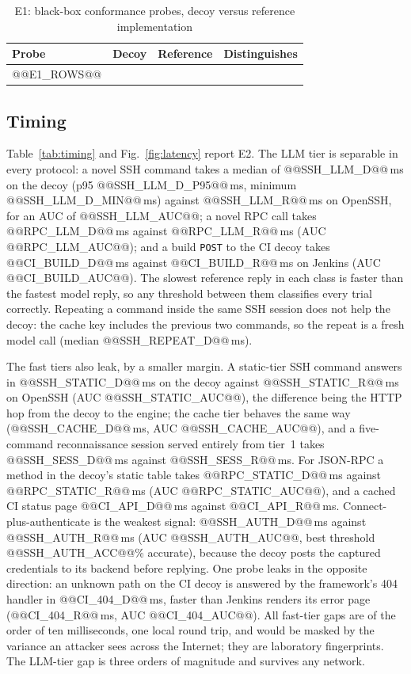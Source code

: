 \documentclass[conference]{IEEEtran}
\begin{document}
\begin{table}[!t]
\caption{E1: black-box conformance probes, decoy versus reference implementation}
\label{tab:conf}
\centering
\footnotesize
\renewcommand{\arraystretch}{1.12}
\begin{tabular}{@{}p{}p{}p{}c@{}}
\toprule
Probe & Decoy & Reference & Distinguishes \\
\midrule
@@E1_ROWS@@
\bottomrule
\end{tabular}
\end{table}

\subsection{Timing}
\label{sec:res-time}
Table~\ref{tab:timing} and Fig.~\ref{fig:latency} report E2. The LLM tier is separable in every protocol: a novel SSH command takes a median of @@SSH_LLM_D@@\,ms on the decoy (p95 @@SSH_LLM_D_P95@@\,ms, minimum @@SSH_LLM_D_MIN@@\,ms) against @@SSH_LLM_R@@\,ms on OpenSSH, for an AUC of @@SSH_LLM_AUC@@; a novel RPC call takes @@RPC_LLM_D@@\,ms against @@RPC_LLM_R@@\,ms (AUC @@RPC_LLM_AUC@@); and a build \texttt{POST} to the CI decoy takes @@CI_BUILD_D@@\,ms against @@CI_BUILD_R@@\,ms on Jenkins (AUC @@CI_BUILD_AUC@@). The slowest reference reply in each class is faster than the fastest model reply, so any threshold between them classifies every trial correctly. Repeating a command inside the same SSH session does not help the decoy: the cache key includes the previous two commands, so the repeat is a fresh model call (median @@SSH_REPEAT_D@@\,ms).

The fast tiers also leak, by a smaller margin. A static-tier SSH command answers in @@SSH_STATIC_D@@\,ms on the decoy against @@SSH_STATIC_R@@\,ms on OpenSSH (AUC @@SSH_STATIC_AUC@@), the difference being the HTTP hop from the decoy to the engine; the cache tier behaves the same way (@@SSH_CACHE_D@@\,ms, AUC @@SSH_CACHE_AUC@@), and a five-command reconnaissance session served entirely from tier~1 takes @@SSH_SESS_D@@\,ms against @@SSH_SESS_R@@\,ms. For JSON-RPC a method in the decoy's static table takes @@RPC_STATIC_D@@\,ms against @@RPC_STATIC_R@@\,ms (AUC @@RPC_STATIC_AUC@@), and a cached CI status page @@CI_API_D@@\,ms against @@CI_API_R@@\,ms. Connect-plus-authenticate is the weakest signal: @@SSH_AUTH_D@@\,ms against @@SSH_AUTH_R@@\,ms (AUC @@SSH_AUTH_AUC@@, best threshold @@SSH_AUTH_ACC@@\% accurate), because the decoy posts the captured credentials to its backend before replying. One probe leaks in the opposite direction: an unknown path on the CI decoy is answered by the framework's 404 handler in @@CI_404_D@@\,ms, faster than Jenkins renders its error page (@@CI_404_R@@\,ms, AUC @@CI_404_AUC@@). All fast-tier gaps are of the order of ten milliseconds, one local round trip, and would be masked by the variance an attacker sees across the Internet; they are laboratory fingerprints. The LLM-tier gap is three orders of magnitude and survives any network.
\end{document}
